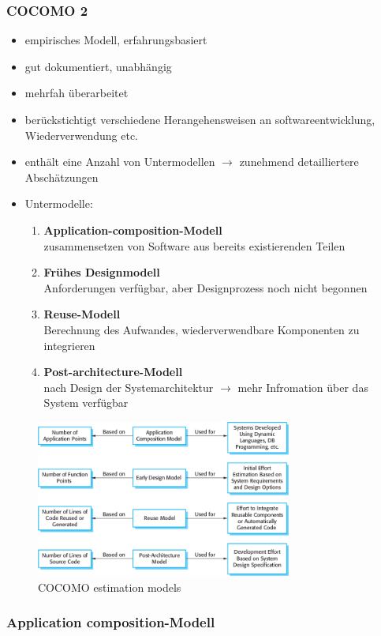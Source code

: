 \subsubsection{COCOMO 2}
\begin{itemize}
    \item empirisches Modell, erfahrungsbasiert
    \item gut dokumentiert, unabhängig
    \item mehrfah überarbeitet
    \item berückstichtigt verschiedene Herangehensweisen an softwareentwicklung, Wiederverwendung etc.
    \item enthält eine Anzahl von Untermodellen $\rightarrow$ zunehmend detailliertere Abschätzungen 
    \item Untermodelle:
    \begin{enumerate}
        \item \textbf{Application-composition-Modell} \\
        zusammensetzen von Software aus bereits existierenden Teilen
        \item \textbf{Frühes Designmodell} \\
        Anforderungen verfügbar, aber Designprozess noch nicht begonnen
        \item \textbf{Reuse-Modell} \\
        Berechnung des Aufwandes, wiederverwendbare Komponenten zu integrieren
        \item \textbf{Post-architecture-Modell}\\
        nach Design der Systemarchitektur $\rightarrow$ mehr Infromation über das System verfügbar
    \end{enumerate}
\end{itemize}
\begin{figure}[h]
    \centering
    \includegraphics[width=0.75\textwidth]{mainmatter/pics/cocomo.png}
    \caption{COCOMO estimation models}
\end{figure}

\subsubsection{Application composition-Modell}
